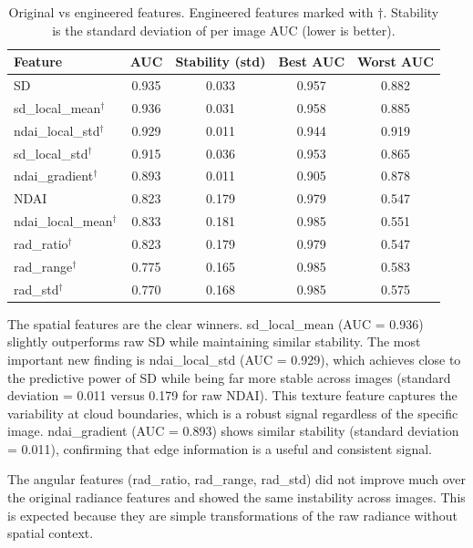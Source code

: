 \documentclass[10pt,letterpaper]{article}
\begin{document}
\begin{table}[H]
\centering
\small
\caption{Original vs engineered features. Engineered features marked with $\dagger$. Stability is the standard deviation of per image AUC (lower is better).}
\label{tab:new_features}
\begin{tabular}{lcccc}
\toprule
Feature & AUC & Stability (std) & Best AUC & Worst AUC \\
\midrule
SD                          & 0.935 & 0.033 & 0.957 & 0.882 \\
sd\_local\_mean$^\dagger$   & 0.936 & 0.031 & 0.958 & 0.885 \\
ndai\_local\_std$^\dagger$  & 0.929 & 0.011 & 0.944 & 0.919 \\
sd\_local\_std$^\dagger$    & 0.915 & 0.036 & 0.953 & 0.865 \\
ndai\_gradient$^\dagger$    & 0.893 & 0.011 & 0.905 & 0.878 \\
NDAI                        & 0.823 & 0.179 & 0.979 & 0.547 \\
ndai\_local\_mean$^\dagger$ & 0.833 & 0.181 & 0.985 & 0.551 \\
rad\_ratio$^\dagger$        & 0.823 & 0.179 & 0.979 & 0.547 \\
rad\_range$^\dagger$        & 0.775 & 0.165 & 0.985 & 0.583 \\
rad\_std$^\dagger$          & 0.770 & 0.168 & 0.985 & 0.575 \\
\bottomrule
\end{tabular}
\end{table}
 

The spatial features are the clear winners. sd\_local\_mean (AUC = 0.936) slightly outperforms raw SD while maintaining similar stability. The most important new finding is ndai\_local\_std (AUC = 0.929), which achieves close to the predictive power of SD while being far more stable across images (standard deviation = 0.011 versus 0.179 for raw NDAI). This texture feature captures the variability at cloud boundaries, which is a robust signal regardless of the specific image. ndai\_gradient (AUC = 0.893) shows similar stability (standard deviation = 0.011), confirming that edge information is a useful and consistent signal.
 
The angular features (rad\_ratio, rad\_range, rad\_std) did not improve much over the original radiance features and showed the same instability across images. This is expected because they are simple transformations of the raw radiance without spatial context.
 
\end{document}
